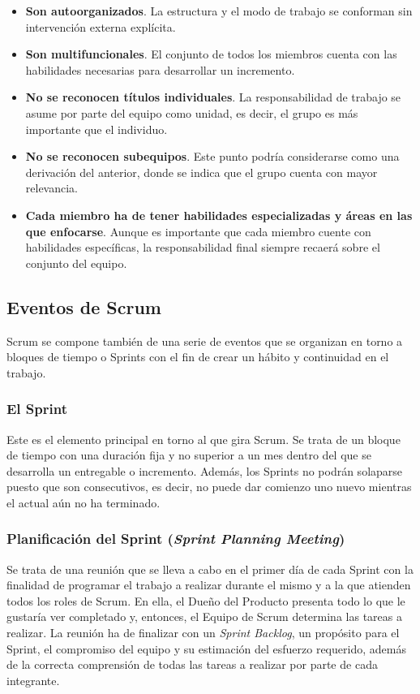 \begin{itemize}
    \item \textbf{Son autoorganizados}. La estructura y el modo de trabajo se conforman sin intervención externa explícita.
    \item \textbf{Son multifuncionales}. El conjunto de todos los miembros cuenta con las habilidades necesarias para desarrollar un incremento.
    \item \textbf{No se reconocen títulos individuales}. La responsabilidad de trabajo se asume por parte del equipo como unidad, es decir, el grupo es más importante que el individuo.
    \item \textbf{No se reconocen subequipos}. Este punto podría considerarse como una derivación del anterior, donde se indica que el grupo cuenta con mayor relevancia.
    \item \textbf{Cada miembro ha de tener habilidades especializadas y áreas en las que enfocarse}. Aunque es importante que cada miembro cuente con habilidades específicas, la responsabilidad final siempre recaerá sobre el conjunto del equipo.
\end{itemize}

\subsection{Eventos de Scrum}
Scrum se compone también de una serie de eventos que  se organizan en torno a bloques de tiempo o Sprints con el fin de crear un hábito y continuidad en el trabajo.

\subsubsection{El Sprint}
Este es el elemento principal en torno al que gira Scrum. Se trata de un bloque de tiempo con una duración fija y no superior a un mes dentro del que se desarrolla un entregable o incremento. Además, los Sprints no podrán solaparse puesto que son consecutivos, es decir, no puede dar comienzo uno nuevo mientras el actual aún no ha terminado.


\subsubsection{Planificación del Sprint (\textit{Sprint Planning Meeting})}
Se trata de una reunión que se lleva a cabo en el primer día de cada Sprint con la finalidad de programar el trabajo a realizar durante el mismo y a la que atienden todos los roles de Scrum. En ella, el Dueño del Producto presenta todo lo que le gustaría ver completado y, entonces, el Equipo de Scrum determina las tareas a realizar. La reunión ha de finalizar con un \textit{Sprint Backlog}, un propósito para el Sprint, el compromiso del equipo y su estimación del esfuerzo requerido, además de la correcta comprensión de todas las tareas a realizar por parte de cada integrante.


